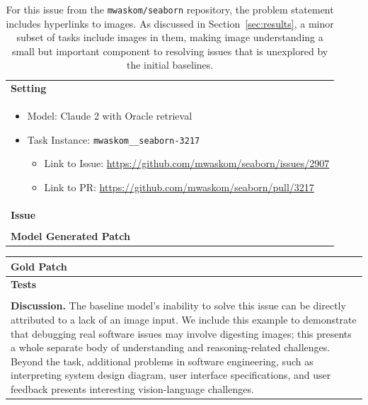 \begin{table}[ht]
\caption{
For this issue from the \texttt{mwaskom/seaborn} repository, the problem statement includes hyperlinks to images. As discussed in Section~\ref{sec:results}, a minor subset of \benchmark{} tasks include images in them, making image understanding a small but important component to resolving issues that is unexplored by the initial baselines.
}
\label{table:appx:quality-example9}
\centering
\begin{tabular}{p{\linewidth}}
    \toprule
    \textbf{Setting} \\
    \begin{itemize}[noitemsep,topsep=0pt]
        \item Model: Claude 2 with Oracle retrieval
        \item Task Instance: \texttt{mwaskom\_\_seaborn-3217}
        \begin{itemize}
            \item Link to Issue: \href{https://github.com/mwaskom/seaborn/issues/2907}{https://github.com/mwaskom/seaborn/issues/2907}
            \item Link to PR: \href{https://github.com/mwaskom/seaborn/pull/3217}{https://github.com/mwaskom/seaborn/pull/3217}
        \end{itemize}
    \end{itemize} \\
    \midrule
    \textbf{Issue} \\
     \\
    \midrule
    \textbf{Model Generated Patch}
     \\
    \bottomrule
\end{tabular}
\end{table}
\begin{table}
\begin{tabular}{p{\linewidth}}
\toprule
\textbf{Gold Patch}
 \\
\midrule
\textbf{Tests} \\
 \\
\midrule
\textbf{Discussion.} The baseline model's inability to solve this issue can be directly attributed to a lack of an image input. We include this example to demonstrate that debugging real software issues may involve digesting images; this presents a whole separate body of understanding and reasoning-related challenges. Beyond the \benchmark{} task, additional problems in software engineering, such as interpreting system design diagram, user interface specifications, and user feedback presents interesting vision-language challenges. \\
\bottomrule
\end{tabular}
\end{table}
\newpage